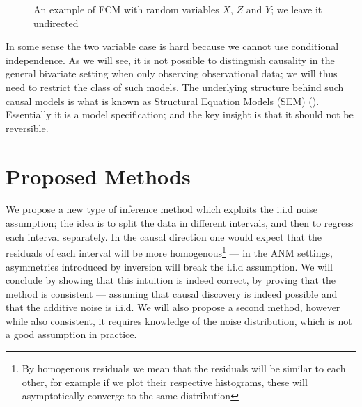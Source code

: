\begin{figure}[!h]
    \centering

    \caption{An example of FCM with random variables $X$, $Z$ and $Y$; we leave it undirected}
    \label{fig:conditionalIndep}

\end{figure}

In some sense the two variable case is hard because we cannot use conditional independence. As we will see, 
it is not possible to distinguish causality in the general bivariate setting when only observing 
observational data; we will thus need to restrict 
the class of such models. The underlying structure behind such causal models is what is known as 
Structural Equation Models (SEM) (\cite{Peters2017}). Essentially 
it is a model specification; and the key insight is that it should not be reversible.


\section{Proposed Methods}

We propose a new type of inference method which exploits the i.i.d 
noise assumption; the idea is to split the data in different intervals, and then to regress each 
interval separately. In the causal direction one would expect that the residuals of each 
interval will be more homogenous\footnote{By homogenous residuals we mean that the residuals will be similar 
to each other, for example if we plot their respective histograms, these will asymptotically converge to the 
same distribution}  --- in the ANM settings, asymmetries introduced
by inversion will break the i.i.d assumption. We will conclude by 
showing that this intuition is indeed correct, by proving that the method is consistent --- 
assuming that causal discovery is indeed possible and that the additive noise is i.i.d. We will
also propose a second method, however while also consistent, it requires knowledge of the 
noise distribution, which is not a good assumption in practice. 


